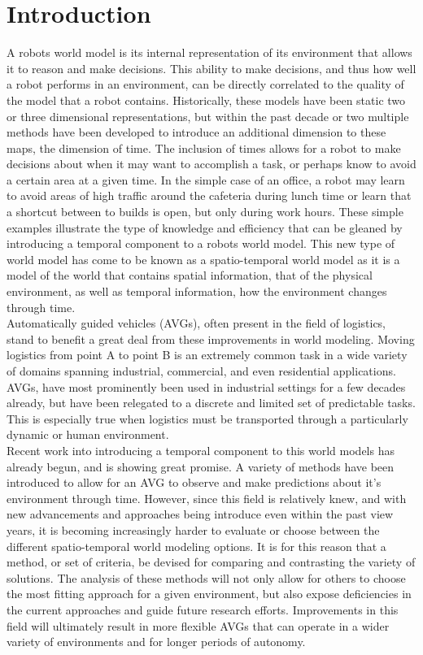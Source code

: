 
\chapter{ Introduction }

A robots world model is its internal representation of its environment that
allows it to reason and make decisions. This ability to make decisions, and
thus how well a robot performs in an environment, can be directly correlated
to the quality of the model that a robot contains.  Historically, these models
have been static two or three dimensional representations, but within the past
decade or two multiple methods have been developed to introduce an additional
dimension to these maps, the dimension of time. The inclusion of times allows
for a robot to make decisions about when it may want to accomplish a task, or
perhaps know to avoid a certain area at a given time. In the simple case of an
office, a robot may learn to avoid areas of high traffic around the cafeteria
during lunch time or learn that a shortcut between to builds is open, but only
during work hours. These simple examples illustrate the type of knowledge and
efficiency that can be gleaned by introducing a temporal component to a robots
world model. This new type of world model has come to be known as a
spatio-temporal world model as it is a model of the world that contains
spatial information, that of the physical environment, as well as temporal
information, how the environment changes through time.\\

Automatically guided vehicles (AVGs), often present in the field of logistics,
stand to benefit a great deal from these improvements in world modeling.
Moving logistics from point A to point B is an extremely common task in a wide
variety of domains spanning industrial, commercial, and even residential
applications. AVGs, have most prominently been used in industrial settings for
a few decades already, but have been relegated to a discrete and limited set
of predictable tasks. This is especially true when logistics must be
transported through a particularly dynamic or human environment.\\

Recent work into introducing a temporal component to this world models has
already begun, and is showing great promise. A variety of methods have been
introduced to allow for an AVG to observe and make predictions about it's
environment through time. However, since this field is relatively knew, and
with new advancements and approaches being introduce even within the past view
years, it is becoming increasingly harder to evaluate or choose between the
different spatio-temporal world modeling options. It is for this reason that a
method, or set of criteria, be devised for comparing and contrasting the
variety of solutions. The analysis of these methods will not only allow for
others to choose the most fitting approach for a given environment, but also
expose deficiencies in the current approaches and guide future research
efforts.  Improvements in this field will ultimately result in more flexible
AVGs that can operate in a wider variety of environments and for longer
periods of autonomy.


